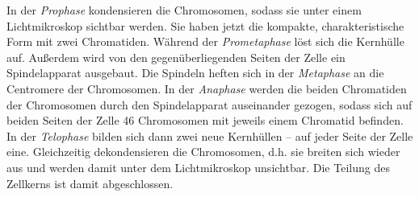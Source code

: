 In der \emph{Prophase} kondensieren die Chromosomen, sodass sie unter einem Lichtmikroskop sichtbar werden. Sie haben jetzt die kompakte, charakteristische Form mit zwei Chromatiden. Während der \emph{Prometaphase} löst sich die Kernhülle auf. Außerdem wird von den gegenüberliegenden Seiten der Zelle ein Spindelapparat ausgebaut. Die Spindeln heften sich in der \emph{Metaphase} an die Centromere der Chromosomen. In der \emph{Anaphase} werden die beiden Chromatiden der Chromosomen durch den Spindelapparat auseinander gezogen, sodass sich auf beiden Seiten der Zelle 46 Chromosomen mit jeweils einem Chromatid befinden. In der \emph{Telophase} bilden sich dann zwei neue Kernhüllen -- auf jeder Seite der Zelle eine. Gleichzeitig dekondensieren die Chromosomen, d.h. sie breiten sich wieder aus und werden damit unter dem Lichtmikroskop unsichtbar. Die Teilung des Zellkerns ist damit abgeschlossen. 

